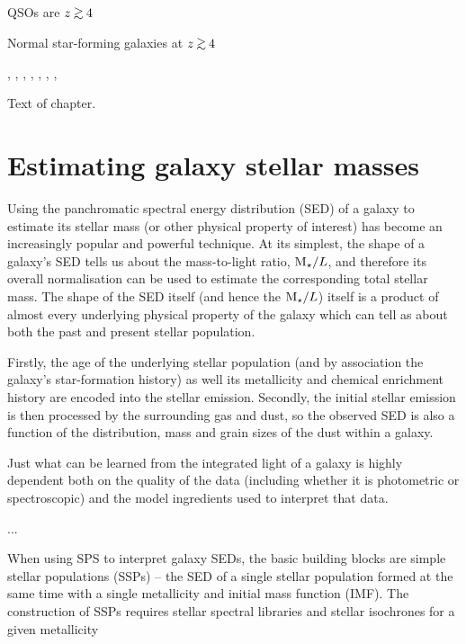 QSOs are $z \simgreat 4$
\citep{1990ApJ...357L...9G}

\citep{1992AJ....104..941S}

Normal star-forming galaxies at $z \simgreat 4$
\citep{Steidel:1995kx}
\citep{Steidel:1996jd}
\citep{1996MNRAS.283.1388M}

\citep{1999ApJ...519....1S}

\citep{Thompson:2001da}, \citep{Thompson:2003dp}, \citep{Fontana:2003ch}, \citep{Giavalisco:2004et}, \citep{Dickinson:2004ba}, \citep{Capak:2004im}, \citep{Stanway:2003fx}, \citep{Stanway:2004kr}

Text of chapter.  


\section{Estimating galaxy stellar masses}
Using the panchromatic spectral energy distribution (SED) of a galaxy to estimate its stellar mass (or other physical property of interest) has become an increasingly popular and powerful technique. At its simplest, the shape of a galaxy's SED tells us about the mass-to-light ratio, $\text{M}_{\star}/L$, and therefore its overall normalisation can be used to estimate the corresponding total stellar mass. The shape of the SED itself (and hence the $\text{M}_{\star}/L$) itself is a product of almost every underlying physical property of the galaxy which can tell as about both the past and present stellar population.

Firstly, the age of the underlying stellar population (and by association the galaxy's star-formation history) as well its metallicity and chemical enrichment history are encoded into the stellar emission. Secondly, the initial stellar emission is then processed by the surrounding gas and dust, so the observed SED is also a function of the distribution, mass and grain sizes of the dust within a galaxy.

Just what can be learned from the integrated light of a galaxy is highly dependent both on the quality of the data (including whether it is photometric or spectroscopic) and the model ingredients used to interpret that data.

...

When using SPS to interpret galaxy SEDs, the basic building blocks are simple stellar populations (SSPs) -- the SED of a single stellar population formed at the same time with a single metallicity and initial mass function (IMF). The construction of SSPs requires stellar spectral libraries and stellar isochrones for a given metallicity


